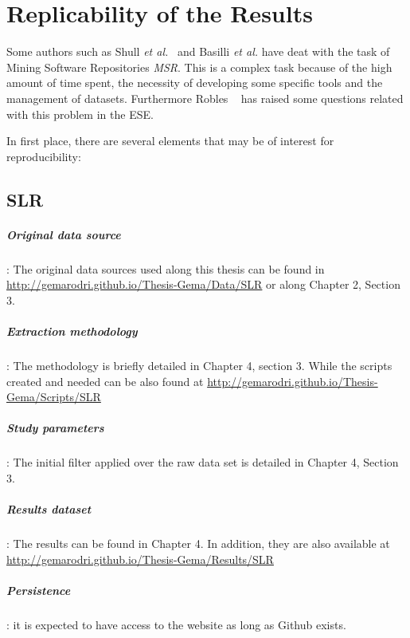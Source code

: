 \documentclass[a4paper, 12pt]{book}
\begin{document}
\cleardoublepage
\appendix
\chapter{Replicability of the Results}
\label{app:replicability}

Some authors such as Shull \emph{et al.}~\cite{shull2008role} and Basilli \emph{et al.} \cite{basili1999building} have deat with the task of Mining Software Repositories \emph{MSR}.  This is a complex task because of the high amount of time spent, the necessity of developing some specific tools and the management of datasets. Furthermore Robles ~\cite{robles2010replicating} has raised some questions related with this problem in the ESE.

In first place, there are several elements that may be of interest for reproducibility:

\section{SLR}
\label{sec:replicabilitySLR}
\paragraph{Original data source}: The original data sources used along this thesis can be found in \url{http://gemarodri.github.io/Thesis-Gema/Data/SLR} or along Chapter 2, Section 3.
\paragraph{Extraction methodology}: The methodology is briefly detailed in Chapter 4, section 3. While the scripts created and needed can be also found at \url{http://gemarodri.github.io/Thesis-Gema/Scripts/SLR}
\paragraph{Study parameters}: The initial filter applied over the raw data set is detailed in Chapter 4, Section 3. 
\paragraph{Results dataset}: The results can be found in Chapter 4. In addition, they are also available at \url{http://gemarodri.github.io/Thesis-Gema/Results/SLR}
\paragraph{Persistence}: it is expected to have access to the website as long as Github exists. 
\end{document}
